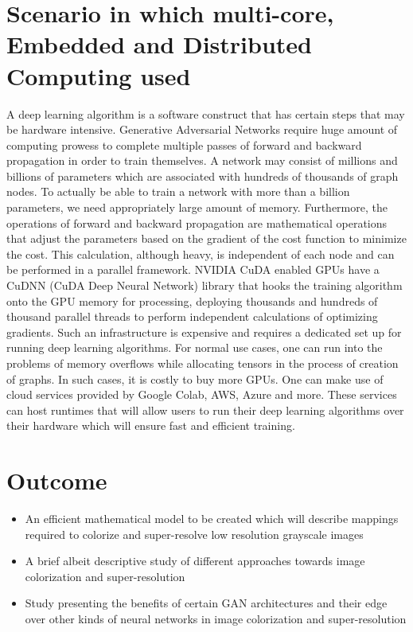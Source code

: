 \documentclass[oneside,a4paper,12pt]{report}
\begin{document}
\section{Scenario in which multi-core, Embedded and Distributed Computing used}
 A deep learning algorithm is a software construct that has certain steps that may be hardware intensive. Generative Adversarial Networks require huge amount of computing prowess to complete multiple passes of forward and backward propagation in order to train themselves. A network may consist of millions and billions of parameters which are associated with hundreds of thousands of graph nodes. To actually be able to train a network with more than a billion parameters, we need appropriately large amount of memory. Furthermore, the operations of forward and backward propagation are mathematical operations that adjust the parameters based on the gradient of the cost function to minimize the cost. This calculation, although heavy, is independent of each node and can be performed in a parallel framework. NVIDIA CuDA enabled GPUs have a CuDNN (CuDA Deep Neural Network) library that hooks the training algorithm onto the GPU memory for processing, deploying thousands and hundreds of thousand parallel threads to perform independent calculations of optimizing gradients. Such an infrastructure is expensive and requires a dedicated set up for running deep learning algorithms. For normal use cases, one can run into the problems of memory overflows while allocating tensors in the process of creation of graphs. In such cases, it is costly to buy more GPUs. One can make use of cloud services provided by Google Colab, AWS, Azure and more. These services can host runtimes that will allow users to run their deep learning algorithms over their hardware which will ensure fast and efficient training.


\section{Outcome}
\begin{itemize}
\item An efficient mathematical model to be created which will describe mappings required to colorize and super-resolve low resolution grayscale images
\item A brief albeit descriptive study of different approaches towards image colorization and super-resolution
\item Study presenting the benefits of certain GAN architectures and their edge over other kinds of neural networks in image colorization and super-resolution
\end{itemize}
\end{document}
